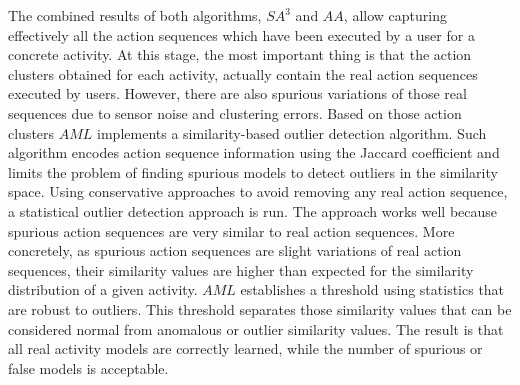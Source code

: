 The combined results of both algorithms, $SA^3$ and $AA$, allow capturing effectively all the action sequences which have been executed by a user for a concrete activity. At this stage, the most important thing is that the action clusters obtained for each activity, actually contain the real action sequences executed by users. However, there are also spurious variations of those real sequences due to sensor noise and clustering errors. Based on those action clusters $AML$ implements a similarity-based outlier detection algorithm. Such algorithm encodes action sequence information using the Jaccard coefficient and limits the problem of finding spurious models to detect outliers in the similarity space. Using conservative approaches to avoid removing any real action sequence, a statistical outlier detection approach is run. The approach works well because spurious action sequences are very similar to real action sequences. More concretely, as spurious action sequences are slight variations of real action sequences, their similarity values are higher than expected for the similarity distribution of a given activity. $AML$ establishes a threshold using statistics that are robust to outliers. This threshold separates those similarity values that can be considered normal from anomalous or outlier similarity values. The result is that all real activity models are correctly learned, while the number of spurious or false models is acceptable. 

